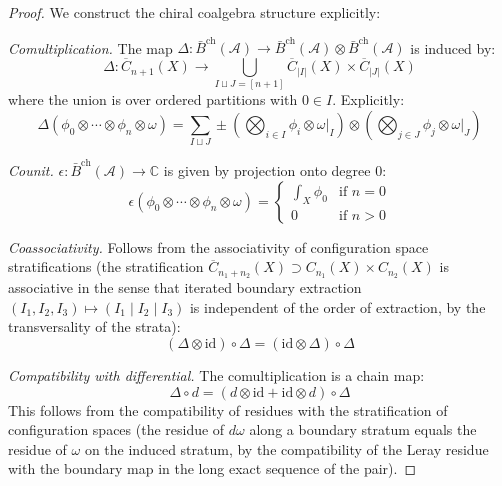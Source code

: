 \begin{proof}
We construct the chiral coalgebra structure explicitly:

\emph{Comultiplication.} The map $\Delta: \bar{B}^{\text{ch}}(\mathcal{A}) \to \bar{B}^{\text{ch}}(\mathcal{A}) \otimes \bar{B}^{\text{ch}}(\mathcal{A})$ is induced by:
\[
\Delta: \overline{C}_{n+1}(X) \to \bigcup_{I \sqcup J = [n+1]} \overline{C}_{|I|}(X) \times \overline{C}_{|J|}(X)
\]
where the union is over ordered partitions with $0 \in I$. Explicitly:
\[
\Delta(\phi_0 \otimes \cdots \otimes \phi_n \otimes \omega) = \sum_{I \sqcup J} \pm \left(\bigotimes_{i \in I} \phi_i \otimes \omega|_I\right) \otimes \left(\bigotimes_{j \in J} \phi_j \otimes \omega|_J\right)
\]

\emph{Counit.} $\epsilon: \bar{B}^{\text{ch}}(\mathcal{A}) \to \mathbb{C}$ is given by projection onto degree 0:
\[
\epsilon(\phi_0 \otimes \cdots \otimes \phi_n \otimes \omega) = \begin{cases}
\int_X \phi_0 & \text{if } n = 0 \\
0 & \text{if } n > 0
\end{cases}
\]

\emph{Coassociativity.} Follows from the associativity of configuration space stratifications
(the stratification $\overline{C}_{n_1+n_2}(X) \supset C_{n_1}(X) \times C_{n_2}(X)$ is associative in the sense that iterated boundary extraction $(I_1, I_2, I_3) \mapsto (I_1 \mid I_2 \mid I_3)$ is independent of the order of extraction, by the transversality of the strata):
\[
(\Delta \otimes \text{id}) \circ \Delta = (\text{id} \otimes \Delta) \circ \Delta
\]

\emph{Compatibility with differential.} The comultiplication is a chain map:
\[
\Delta \circ d = (d \otimes \text{id} + \text{id} \otimes d) \circ \Delta
\]
This follows from the compatibility of residues with the stratification of configuration spaces
(the residue of $d\omega$ along a boundary stratum equals the residue of $\omega$ on the induced stratum, by the compatibility of the Leray residue with the boundary map in the long exact sequence of the pair).
\end{proof}

